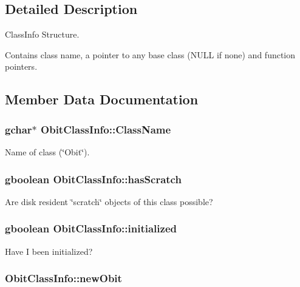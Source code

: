 \subsection{Detailed Description}
Class\-Info Structure. 

Contains class name, a pointer to any base class (NULL if none) and function pointers. 



\subsection{Member Data Documentation}
\subsubsection{\setlength{\rightskip}{0pt plus 5cm}gchar$\ast$ {\bf Obit\-Class\-Info::Class\-Name}}\label{structObitClassInfo_o2}


Name of class (\char`\"{}Obit\char`\"{}). 

\subsubsection{\setlength{\rightskip}{0pt plus 5cm}gboolean {\bf Obit\-Class\-Info::has\-Scratch}}\label{structObitClassInfo_o1}


Are disk resident \char`\"{}scratch\char`\"{} objects of this class possible? 

\subsubsection{\setlength{\rightskip}{0pt plus 5cm}gboolean {\bf Obit\-Class\-Info::initialized}}\label{structObitClassInfo_o0}


Have I been initialized? 

\subsubsection{ {\bf Obit\-Class\-Info::new\-Obit}}\label{structObitClassInfo_o5}



